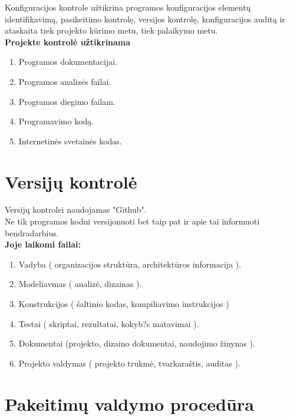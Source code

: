 \documentclass[a4paper,12pt]{article}
\begin{document}
Konfiguracijos kontrole u\v ztikrina programos konfiguracijos element\k u identifikavim\k a, pasikeitimo kontrol\k e, versijos kontrol\k e, konfiguracijos audit\k a ir ataskaita tiek projekto k\= urimo metu, tiek palaikymo metu.\\
\vspace{3cm}
\large\textbf{Projekte kontrol\. e u\v ztikrinama}
\normalsize
\begin{enumerate}
	\item Programos dokumentacijai.
	\item Programos analiz\. es failai.
	\item Programos diegimo failam.
	\item Programavimo kodą.
	\item Internetinės svetainės kodas.
\end{enumerate}

\clearpage

\section{Versij\k u kontrol\. e}

Versij\k u kontrolei naudojamas "Github".\\
Ne tik programos kodui versijonuoti bet taip pat ir apie tai informuoti bendradarbius.\\

\large\textbf{Joje laikomi failai:}
\normalsize
\begin{enumerate}

	\item Vadyba ( organizacijos strukt\= ura, architekt\= uros informacija ).
	\item Modeliavmas ( analiz\. e, dizainas ).
	\item Konstrukcijos ( \v saltinio kodas, kompiliavimo instrukcijos )
	\item Testai ( skriptai, rezultatai, kokyb?s matavimai ).
	\item Dokumentai (projekto, dizaino dokumentai, naudojimo \v zinynas ).
	\item Projekto valdymas ( projekto trukm\. e, tvarkara\v stis, auditas ).
		
\end{enumerate}
\clearpage 


\section{Pakeitimų valdymo procedūra}
\end{document}
